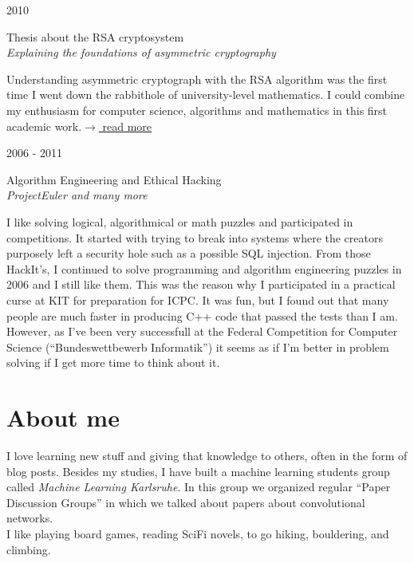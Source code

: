 \documentclass[a4paper,10pt]{article} %
\begin{document}
{\begin{minipage}[t]{0.5\textwidth}

{\raggedleft\textsc{2010}\par}

{\raggedright\large Thesis about the RSA cryptosystem\\
\textit{Explaining the foundations of asymmetric cryptography}\\[5pt]}

\normalsize{Understanding asymmetric cryptograph with the RSA algorithm was the
first time I went down the rabbithole of university-level mathematics. I could
combine my enthusiasm for computer science, algorithms and mathematics in this
first academic work.}\hfill \href{http://www.martin-thoma.de/Facharbeit-Martin-Thoma-2.pdf}{$\rightarrow$ read more}\\


{\raggedleft\textsc{2006 - 2011}\par}

{\raggedright\large Algorithm Engineering and Ethical Hacking\\
\textit{ProjectEuler and many more}\\[5pt]}

\normalsize{I like solving logical, algorithmical or math
puzzles and participated in competitions. It started with trying to break into
systems where the creators purposely left a security hole such as a possible
SQL injection. From those HackIt's, I continued to solve programming and
algorithm engineering puzzles in 2006 and I still like them. This was the
reason why I participated in a practical curse at KIT for preparation for ICPC.
It was fun, but I found out that many people are much faster in producing C++
code that passed the tests than I am. However, as I've been very successfull at
the Federal Competition for Computer Science (``Bundeswettbewerb Informatik'')
it seems as if I'm better in problem solving if I get more time to think about
it.}\\

\section{About me}
I love learning new stuff and giving that knowledge to others, often in the
form of blog posts. Besides my studies, I have built a machine learning
students group called \textit{Machine Learning Karlsruhe}. In this
group we organized regular \enquote{Paper Discussion Groups} in which we talked
about papers about convolutional networks.\\
I like playing board games, reading SciFi novels, to go hiking, bouldering, and climbing.


\end{minipage}}
\end{document}
